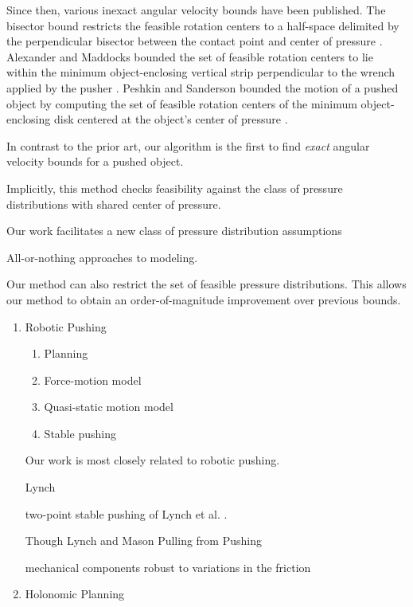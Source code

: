 \documentclass[conference]{IEEEtran}
\begin{document}
Since then, various inexact angular velocity bounds have been
published. The bisector bound restricts the feasible rotation centers
to a half-space delimited by the perpendicular bisector between the
contact point and center of pressure \cite{Mason}.  Alexander and
Maddocks bounded the set of feasible rotation centers to lie within
the minimum object-enclosing vertical strip perpendicular to the
wrench applied by the pusher \cite{alexander1993bounds}.  Peshkin and
Sanderson bounded the motion of a pushed object by computing the set
of feasible rotation centers of the minimum object-enclosing disk
centered at the object's center of pressure \cite{peshkin1988motion}.

In contrast to the prior art, our algorithm is the first to find
\textit{exact} angular velocity bounds for a pushed object. 

Implicitly, this method checks feasibility against the class of
pressure distributions with shared center of pressure.

Our work facilitates a new class of pressure distribution assumptions

All-or-nothing approaches to modeling.

Our method can also restrict the set of feasible pressure
distributions. This allows our method to obtain an order-of-magnitude
improvement over previous bounds.

\begin{enumerate}
\item Robotic Pushing
  \begin{enumerate}
  \item Planning
  \item Force-motion model
  \item Quasi-static motion model
  \item Stable pushing
  \end{enumerate}

  Our work is most closely related to robotic pushing.

  Lynch 

  two-point stable pushing of Lynch et al. \cite{}.

  Though Lynch and Mason Pulling from Pushing \cite{lynch1995pulling}

  mechanical components robust to variations in the friction

\item Holonomic Planning
\end{enumerate}
\end{document}
